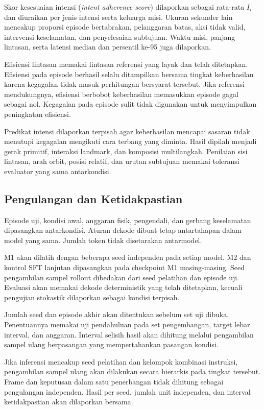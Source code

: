 Skor kesesuaian intensi (\textit{intent adherence score}) dilaporkan sebagai rata-rata $I_i$ dan diuraikan per jenis intensi serta keluarga misi. Ukuran sekunder lain mencakup proporsi episode bertabrakan, pelanggaran batas, aksi tidak valid, intervensi keselamatan, dan penyelesaian subtujuan. Waktu misi, panjang lintasan, serta latensi median dan persentil ke-95 juga dilaporkan.

Efisiensi lintasan memakai lintasan referensi yang layak dan telah ditetapkan. Efisiensi pada episode berhasil selalu ditampilkan bersama tingkat keberhasilan karena kegagalan tidak masuk perhitungan bersyarat tersebut. Jika referensi mendukungnya, efisiensi berbobot keberhasilan memasukkan episode gagal sebagai nol. Kegagalan pada episode sulit tidak digunakan untuk menyimpulkan peningkatan efisiensi.

Predikat intensi dilaporkan terpisah agar keberhasilan mencapai sasaran tidak menutupi kegagalan mengikuti cara terbang yang diminta. Hasil dipilah menjadi gerak primitif, interaksi landmark, dan komposisi multilangkah. Penilaian sisi lintasan, arah orbit, posisi relatif, dan urutan subtujuan memakai toleransi evaluator yang sama antarkondisi.

\subsection{Pengulangan dan Ketidakpastian}
Episode uji, kondisi awal, anggaran fisik, pengendali, dan gerbang keselamatan dipasangkan antarkondisi. Aturan dekode dibuat tetap antartahapan dalam model yang sama. Jumlah token tidak disetarakan antarmodel.

M1 akan dilatih dengan beberapa seed independen pada setiap model. M2 dan kontrol SFT lanjutan dipasangkan pada checkpoint M1 masing-masing. Seed pengambilan sampel rollout dibedakan dari seed pelatihan dan episode uji. Evaluasi akan memakai dekode deterministik yang telah ditetapkan, kecuali pengujian stokastik dilaporkan sebagai kondisi terpisah.

Jumlah seed dan episode akhir akan ditentukan sebelum set uji dibuka. Penentuannya memakai uji pendahuluan pada set pengembangan, target lebar interval, dan anggaran. Interval selisih hasil akan dihitung melalui pengambilan sampel ulang berpasangan yang mempertahankan pasangan kondisi.

Jika inferensi mencakup seed pelatihan dan kelompok kombinasi instruksi, pengambilan sampel ulang akan dilakukan secara hierarkis pada tingkat tersebut. Frame dan keputusan dalam satu penerbangan tidak dihitung sebagai pengulangan independen. Hasil per seed, jumlah unit independen, dan interval ketidakpastian akan dilaporkan bersama.

